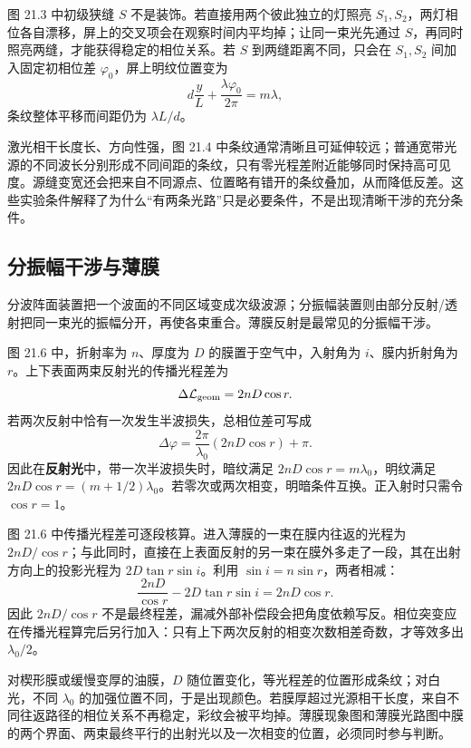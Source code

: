 图 21.3 中初级狭缝 $S$ 不是装饰。若直接用两个彼此独立的灯照亮 $S_1,S_2$，两灯相位各自漂移，屏上的交叉项会在观察时间内平均掉；让同一束光先通过 $S$，再同时照亮两缝，才能获得稳定的相位关系。若 $S$ 到两缝距离不同，只会在 $S_1,S_2$ 间加入固定初相位差 $\varphi_0$，屏上明纹位置变为
\[
 d\frac yL+\frac{\lambda\varphi_0}{2\pi}=m\lambda,
\]
条纹整体平移而间距仍为 $\lambda L/d$。

激光相干长度长、方向性强，图 21.4 中条纹通常清晰且可延伸较远；普通宽带光源的不同波长分别形成不同间距的条纹，只有零光程差附近能够同时保持高可见度。源缝变宽还会把来自不同源点、位置略有错开的条纹叠加，从而降低反差。这些实验条件解释了为什么“有两条光路”只是必要条件，不是出现清晰干涉的充分条件。

\YoungPanel
\YoungPatternPanel

\subsection*{分振幅干涉与薄膜}

分波阵面装置把一个波面的不同区域变成次级波源；分振幅装置则由部分反射/透射把同一束光的振幅分开，再使各束重合。薄膜反射是最常见的分振幅干涉。

图 21.6 中，折射率为 $n$、厚度为 $D$ 的膜置于空气中，入射角为 $i$、膜内折射角为 $r$。上下表面两束反射光的传播光程差为
\[
 \Delta\mathcal L_{\rm geom}=2nD\cos r.
\]
若两次反射中恰有一次发生半波损失，总相位差可写成
\begin{equation}
 \Delta\varphi=\frac{2\pi}{\lambda_0}(2nD\cos r)+\pi.
\end{equation}
因此在\textbf{反射光}中，带一次半波损失时，暗纹满足 $2nD\cos r=m\lambda_0$，明纹满足 $2nD\cos r=(m+1/2)\lambda_0$。若零次或两次相变，明暗条件互换。正入射时只需令 $\cos r=1$。

图 21.6 中传播光程差可逐段核算。进入薄膜的一束在膜内往返的光程为 $2nD/\cos r$；与此同时，直接在上表面反射的另一束在膜外多走了一段，其在出射方向上的投影光程为 $2D\tan r\sin i$。利用 $\sin i=n\sin r$，两者相减：
\[
 \frac{2nD}{\cos r}-2D\tan r\sin i
 =2nD\cos r.
\]
因此 $2nD/\cos r$ 不是最终程差，漏减外部补偿段会把角度依赖写反。相位突变应在传播光程算完后另行加入：只有上下两次反射的相变次数相差奇数，才等效多出 $\lambda_0/2$。

对楔形膜或缓慢变厚的油膜，$D$ 随位置变化，等光程差的位置形成条纹；对白光，不同 $\lambda_0$ 的加强位置不同，于是出现颜色。若膜厚超过光源相干长度，来自不同往返路径的相位关系不再稳定，彩纹会被平均掉。薄膜现象图和薄膜光路图中膜的两个界面、两束最终平行的出射光以及一次相变的位置，必须同时参与判断。

